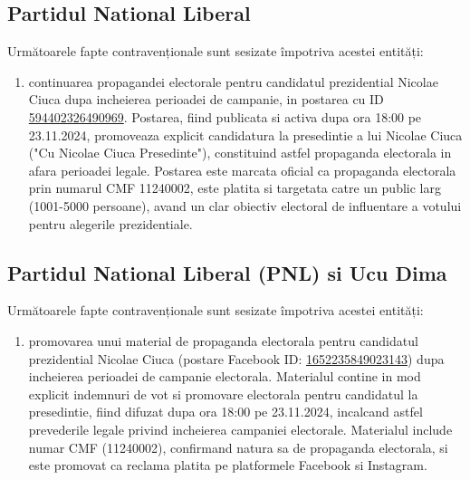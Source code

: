 \documentclass[a4paper,12pt]{article}
\begin{document}
\subsection{Partidul National Liberal}
Următoarele fapte contravenționale sunt sesizate împotriva acestei entități:

\begin{enumerate}[leftmargin=*, label=\arabic*.)]
    \item continuarea propagandei electorale pentru candidatul prezidential Nicolae Ciuca dupa incheierea perioadei de campanie, in postarea cu ID \href{https://www.facebook.com/ads/library/?id=594402326490969}{594402326490969}. Postarea, fiind publicata si activa dupa ora 18:00 pe 23.11.2024, promoveaza explicit candidatura la presedintie a lui Nicolae Ciuca ("Cu Nicolae Ciuca Presedinte"), constituind astfel propaganda electorala in afara perioadei legale. Postarea este marcata oficial ca propaganda electorala prin numarul CMF 11240002, este platita si targetata catre un public larg (1001-5000 persoane), avand un clar obiectiv electoral de influentare a votului pentru alegerile prezidentiale.
\end{enumerate}

\vspace{0.5cm}

\subsection{Partidul National Liberal (PNL) si Ucu Dima}
Următoarele fapte contravenționale sunt sesizate împotriva acestei entități:

\begin{enumerate}[leftmargin=*, label=\arabic*.)]
    \item promovarea unui material de propaganda electorala pentru candidatul prezidential Nicolae Ciuca (postare Facebook ID: \href{https://www.facebook.com/ads/library/?id=1652235849023143}{1652235849023143}) dupa incheierea perioadei de campanie electorala. Materialul contine in mod explicit indemnuri de vot si promovare electorala pentru candidatul la presedintie, fiind difuzat dupa ora 18:00 pe 23.11.2024, incalcand astfel prevederile legale privind incheierea campaniei electorale. Materialul include numar CMF (11240002), confirmand natura sa de propaganda electorala, si este promovat ca reclama platita pe platformele Facebook si Instagram.
\end{enumerate}

\vspace{0.5cm}
\end{document}
